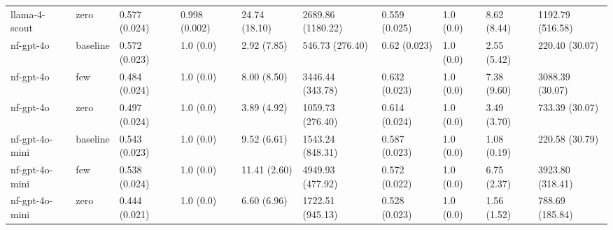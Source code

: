 \begin{table}[htbp]
\begin{tabular}{llllllllll}
llama-4-scout & zero & 0.577 (0.024) & 0.998 (0.002) &  24.74 (18.10) & 2689.86 (1180.22) & 0.559 (0.025) & 1.0 (0.0) &   8.62 (8.44) & 1192.79 (516.58) \\
nf-gpt-4o & baseline & 0.572 (0.023) & 1.0 (0.0) &   2.92 (7.85) & 546.73 (276.40) & 0.62 (0.023) & 1.0 (0.0) &   2.55 (5.42) & 220.40 (30.07) \\
nf-gpt-4o & few & 0.484 (0.024) & 1.0 (0.0) &   8.00 (8.50) & 3446.44 (343.78) & 0.632 (0.023) & 1.0 (0.0) &   7.38 (9.60) & 3088.39 (30.07) \\
nf-gpt-4o & zero & 0.497 (0.024) & 1.0 (0.0) &   3.89 (4.92) & 1059.73 (276.40) & 0.614 (0.024) & 1.0 (0.0) &   3.49 (3.70) & 733.39 (30.07) \\
nf-gpt-4o-mini & baseline & 0.543 (0.023) & 1.0 (0.0) &   9.52 (6.61) & 1543.24 (848.31) & 0.587 (0.023) & 1.0 (0.0) &   1.08 (0.19) & 220.58 (30.79) \\
nf-gpt-4o-mini & few & 0.538 (0.024) & 1.0 (0.0) &  11.41 (2.60) & 4949.93 (477.92) & 0.572 (0.022) & 1.0 (0.0) &   6.75 (2.37) & 3923.80 (318.41) \\
nf-gpt-4o-mini & zero & 0.444 (0.021) & 1.0 (0.0) &   6.60 (6.96) & 1722.51 (945.13) & 0.528 (0.023) & 1.0 (0.0) &   1.56 (1.52) & 788.69 (185.84) \\
\bottomrule
\end{tabular}
\end{table}

